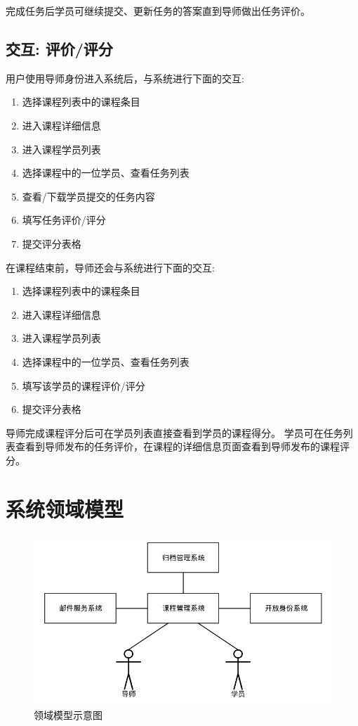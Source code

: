 完成任务后学员可继续提交、更新任务的答案直到导师做出任务评价。

\subsection {交互: 评价/评分}

用户使用导师身份进入系统后，与系统进行下面的交互:

\begin{enumerate}
  \item 选择课程列表中的课程条目
  \item 进入课程详细信息
  \item 进入课程学员列表
  \item 选择课程中的一位学员、查看任务列表
  \item 查看/下载学员提交的任务内容
  \item 填写任务评价/评分
  \item 提交评分表格
\end{enumerate}

在课程结束前，导师还会与系统进行下面的交互:

\begin{enumerate}
  \item 选择课程列表中的课程条目
  \item 进入课程详细信息
  \item 进入课程学员列表
  \item 选择课程中的一位学员、查看任务列表
  \item 填写该学员的课程评价/评分
  \item 提交评分表格
\end{enumerate}

导师完成课程评分后可在学员列表直接查看到学员的课程得分。 学员可在任务列表查看到导师发布的任务评价，在课程的详细信息页面查看到导师发布的课程评分。

\newpage

\section{系统领域模型}

\begin{figure}[!hbp]
  \begin{center}
    \includegraphics[scale=0.5]{figures/diagram-domain-model.png}
    \caption{领域模型示意图\label{DomainModel}}
  \end{center}
\end{figure}

